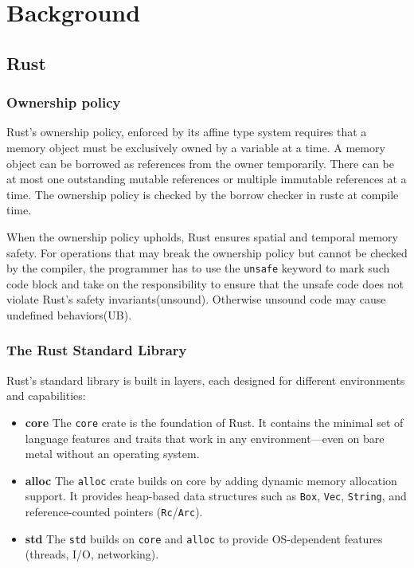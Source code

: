 \documentclass[conference]{IEEEtran}
\begin{document}


\section{Background}

\subsection{Rust}
\subsubsection{Ownership policy}
Rust's ownership policy, enforced by its affine type system requires that a memory object must be exclusively owned by a variable at a time. A memory object can be borrowed as references from the owner temporarily. There can be at most one outstanding mutable references or multiple immutable references at a time. The ownership policy is checked by the borrow checker in rustc at compile time.

When the ownership policy upholds, Rust ensures spatial and temporal memory safety. For operations that may break the ownership policy but cannot be checked by the compiler, the programmer has to use the \texttt{unsafe} keyword to mark such code block and take on the responsibility to ensure that the unsafe code does not violate Rust's safety invariants(unsound). Otherwise unsound code may cause undefined behaviors(UB).

\subsubsection{The Rust Standard Library}
Rust’s standard library is built in layers, each designed for different environments and capabilities:
\begin{itemize}
        \item \textbf{core} The \texttt{core} crate is the foundation of Rust. It contains the minimal set of language features and traits that work in any environment—even on bare metal without an operating system.
        \item \textbf{alloc} The \texttt{alloc} crate builds on core by adding dynamic memory allocation support. It provides heap-based data structures such as \texttt{Box}, \texttt{Vec}, \texttt{String}, and reference-counted pointers (\texttt{Rc}/\texttt{Arc}).
        \item \textbf{std} The \texttt{std} builds on \texttt{core} and \texttt{alloc} to provide OS-dependent features (threads, I/O, networking).
\end{itemize}
\end{document}
